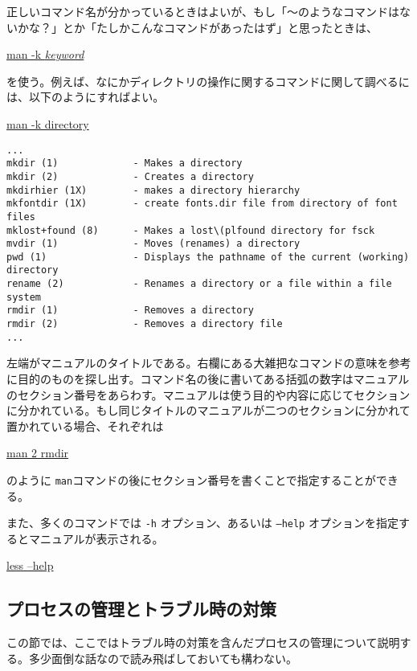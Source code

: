 正しいコマンド名が分かっているときはよいが、もし「〜のようなコマンドはないかな？」とか「たしかこんなコマンドがあったはず」と思ったときは、
\begin{commandline2}
    \prompt \underline{man -k \textit{keyword}}
\end{commandline2} \noindent
を使う。例えば、なにかディレクトリの操作に関するコマンドに関して調べるには、以下のようにすればよい。
\begin{commandline2}
    \prompt \underline{man -k directory}
    \vspace*{-.8em}
    \begin{verbatim}
...
mkdir (1)             - Makes a directory
mkdir (2)             - Creates a directory
mkdirhier (1X)        - makes a directory hierarchy
mkfontdir (1X)        - create fonts.dir file from directory of font files
mklost+found (8)      - Makes a lost\(plfound directory for fsck
mvdir (1)             - Moves (renames) a directory
pwd (1)               - Displays the pathname of the current (working) directory
rename (2)            - Renames a directory or a file within a file system
rmdir (1)             - Removes a directory
rmdir (2)             - Removes a directory file
...
\end{verbatim}
\end{commandline2} \noindent
\noindent 左端がマニュアルのタイトルである。右欄にある大雑把なコマンドの意味を参考に目的のものを探し出す。コマンド名の後に書いてある括弧の数字はマニュアルのセクション番号をあらわす。マニュアルは使う目的や内容に応じてセクションに分かれている。もし同じタイトルのマニュアルが二つのセクションに分かれて置かれている場合、それぞれは
\begin{commandline2}
    \prompt \underline{man 2 rmdir}
\end{commandline2} \noindent
のように \texttt{man}コマンドの後にセクション番号を書くことで指定することができる。

また、多くのコマンドでは \texttt{-h} オプション、あるいは \texttt{--help} オプションを指定するとマニュアルが表示される。
\begin{commandline2}
    \prompt \underline{less --help}
\end{commandline2} \noindent

\subsection{プロセスの管理とトラブル時の対策}
\label{chap: recover}
この節では、ここではトラブル時の対策を含んだプロセスの管理について説明する。多少面倒な話なので読み飛ばしておいても構わない。

